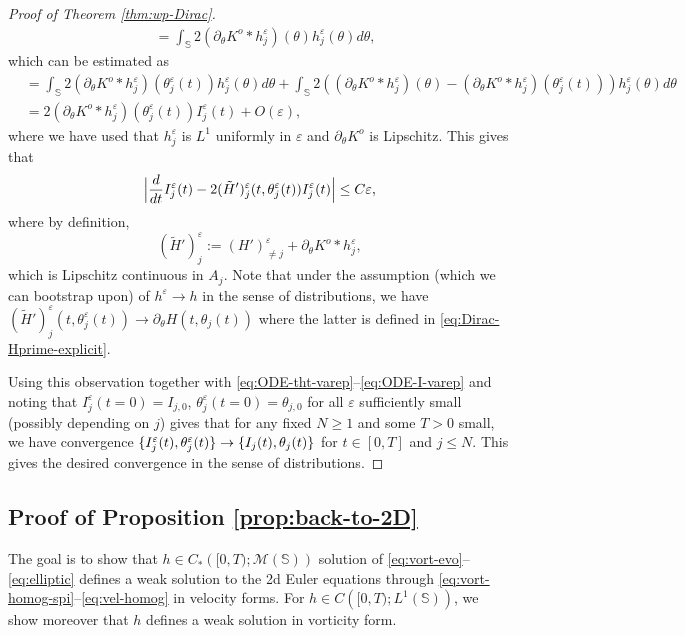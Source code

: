\documentclass[10pt]{amsart}
\theoremstyle{plain}
\theoremstyle{definition}
\let\rd\partial
\let\tht\theta
\let\varep\varepsilon
\newcommand{\bbS}{\mathbb S}
\begin{document}
\begin{proof}[Proof of Theorem \ref{thm:wp-Dirac}]
\begin{equation*}
\begin{split}
& = \int_{\bbS} 2 (\rd_\tht K^o *h^\varep_j) (\tht) h^\varep_j(\tht) d\tht,
\end{split}
\end{equation*}
which can be estimated as
\begin{equation*}
\begin{split}
& = \int_{\bbS} 2 (\rd_\tht K^o *h^\varep_j) (\tht^\varep_j(t)) h^\varep_j(\tht) d\tht + \int_{\bbS} 2((\rd_\tht K^o *h^\varep_j) (\tht) - (\rd_\tht K^o *h^\varep_j) (\tht^\varep_j(t))) h^\varep_j(\tht) d\tht \\
& = 2(\rd_\tht K^o *h^\varep_j) (\tht^\varep_j(t)) I^\varep_j(t) + O(\varep),
\end{split}
\end{equation*}
where we have used that $h^\varep_j$ is $L^1$ uniformly in $\varep $ and $\rd_\tht K^o$ is Lipschitz. This gives that
\begin{equation}\label{eq:ODE-I-varep}
\Bigl| \frac{d}{dt} I^\varep_{j} (t) - 2 (\tilde{H}')^\varep_{j}(t, \tht^\varep_{j}(t)) I^\varep_{j} (t) \Bigr| \le C\varep,
\end{equation}
where by definition,
\begin{equation*}
(\tilde{H}')^\varep_{j} := (H')^\varep_{\ne j} + \rd_\tht K^o *h^\varep_j,
\end{equation*}
which is Lipschitz continuous in $A_{j}$. Note that under the assumption (which we can bootstrap upon) of $h^\varep \to h$ in the sense of distributions, we have $(\tilde{H}')^\varep_{j}(t,\tht^\varep_{j}(t)) \to \partial_{\theta} H(t,\tht_{j}(t))$ where the latter is defined in \eqref{eq:Dirac-Hprime-explicit}.

Using this observation together with \eqref{eq:ODE-tht-varep}--\eqref{eq:ODE-I-varep} and noting that $I^{\varep}_{j}(t=0) = I_{j,0}$, $\tht^{\varep}_{j}(t=0) = \tht_{j,0}$ for all $\varep$ sufficiently small (possibly depending on $j$) gives that for any fixed $N\ge1$ and some $T>0$ small, we have convergence $\{ I^{\varep}_{j}(t), \tht^{\varep}_{j}(t) \} \to\nobreak \{ I_{j}(t), \tht_{j}(t) \}$ for $t \in [0,T]$ and $j\le N$. This gives the desired convergence in the sense of distributions.
\end{proof}

\subsection{Proof of Proposition \ref{prop:back-to-2D}}
The goal is to show that $h\in C_*\left([0,T);\mathcal{M}\left(\mathbb{S}\right)\right)$ solution of \eqref{eq:vort-evo}--\eqref{eq:elliptic} defines a weak solution to the 2d Euler equations through \eqref{eq:vort-homog-spi}--\eqref{eq:vel-homog} in velocity forms. For $h\in C\left([0,T);L^1\left(\mathbb{S}\right)\right)$, we show moreover that $h$ defines a weak solution in vorticity form.
\end{document}
